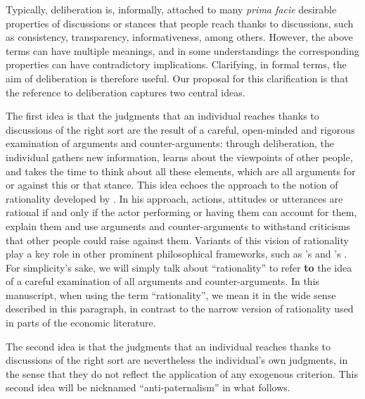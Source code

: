 \documentclass[a4paper, 11pt]{article}
\begin{document}
Typically, deliberation is, informally, attached to many \emph{prima facie} desirable properties of discussions or stances that people reach thanks to discussions, such as consistency, transparency, informativeness, among others. However, the above terms can have multiple meanings, and in some understandings the corresponding properties can have contradictory implications. Clarifying, in formal terms, the aim of deliberation is therefore useful. Our proposal for this clarification is that the reference to deliberation captures two central ideas.

The first idea is that the judgments that an individual reaches thanks to discussions of the right sort are the result of a careful, open-minded and rigorous examination of arguments and counter-arguments: through deliberation, the individual gathers new information, learns about the viewpoints of other people, and takes the time to think about all these elements, 
which are all arguments for or against this or that stance. 
This idea echoes the approach to the notion of rationality developed by \citet{habermas_theorie_1981}.
In his approach, actions, attitudes or utterances are rational if and only if the actor performing or having them can account for them, explain them and use arguments and counter-arguments to withstand criticisms that other people could raise against them. 
Variants of this vision of rationality play a key role in other prominent philosophical frameworks, such as \citeauthor{scanlon_what_2000}’s \citeyearpar{scanlon_what_2000} and \citeauthor{sen_idea_2009}’s \citeyearpar{sen_idea_2009}. 
For simplicity’s sake, we will simply talk about “rationality” to refer \textbf{to} the idea of a careful examination of all arguments and counter-arguments.
In this manuscript, when using the term “rationality”, we mean it in the wide sense described in this paragraph, in contrast to the narrow version of rationality used in parts of the economic literature.

The second idea is that the judgments that an individual reaches thanks to discussions of the right sort are nevertheless the individual’s own judgments, in the sense that they do not reflect the application of any exogenous criterion. 
This second idea will be nicknamed “anti-paternalism” in what follows.
\end{document}
